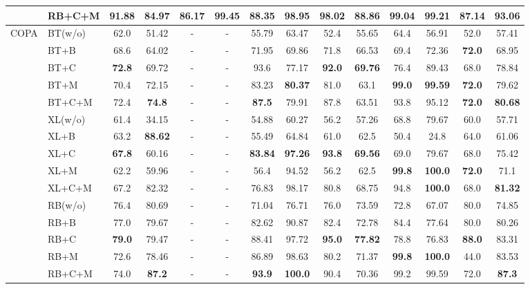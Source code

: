 \documentclass{ecai}  %
\begin{document}
\begin{table*}[th]
\begin{tabular}{ll|c|ccccccccccc}
 						       \\ 
		   & RB+C+M& 91.88&84.97&\bf{86.17}&\bf{99.45}&88.35&\bf{98.95}&98.02&88.86&99.04&99.21&87.14&\bf{93.06}
 					     	       \\ 

	\midrule
		\multirow{15}{*}{COPA} 

 		    
                &  BT(w/o) &62.0&51.42&-&-&55.79&63.47&52.4&55.65&64.4&56.91&52.0&57.41
                						\\ 
		&  BT+B & 68.6&64.02&-&-&71.95&69.86&71.8&66.53&69.4&72.36&\bf{72.0}&68.95
 						        \\ 
		&  BT+C & \bf{72.8}&69.72&-&-&93.6&77.17&\bf{92.0}&\bf{69.76}&76.4&89.43&68.0&78.84
 						        \\ 
		   & BT+M &70.4&72.15&-&-&83.23&\bf{80.37}&81.0&63.1&\bf{99.0}&\bf{99.59}&\bf{72.0}&79.62
 						       \\ 
		   & BT+C+M&72.4&\bf{74.8}&-&-&\bf{87.5}&79.91&87.8&63.51&93.8&95.12&\bf{72.0}&\bf{80.68}
		
 					     	       \\ \cmidrule{2-14}
						          
			&  XL(w/o) &61.4&34.15&-&-&54.88&60.27&56.2&57.26&68.8&79.67&60.0&57.71
                						\\ 
		&  XL+B & 63.2&\bf{88.62}&-&-&55.49&64.84&61.0&62.5&50.4&24.8&64.0&61.06
 						        \\ 
		&  XL+C & \bf{67.8}&60.16&-&-&\bf{83.84}&\bf{97.26}&\bf{93.8}&\bf{69.56}&69.0&79.67&68.0&75.42
 						        \\ 
		   & XL+M & 62.2&59.96&-&-&56.4&94.52&56.2&62.5&\bf{99.8}&\bf{100.0}&\bf{72.0}&71.1
 						       \\ 
		   & XL+C+M&67.2&82.32&-&-&76.83&98.17&80.8&68.75&94.8&\bf{100.0}&68.0&\bf{81.32}
 					     	       \\ \cmidrule{2-14}
	&  RB(w/o) & 76.4&80.69&-&-&71.04&76.71&76.0&73.59&72.8&67.07&80.0&74.85
                						\\ 
		&  RB+B & 77.0&79.67&-&-&82.62&90.87&82.4&72.78&84.4&77.64&80.0&80.26
 						        \\ 
		&  RB+C & \bf{79.0}&79.47&-&-&88.41&97.72&\bf{95.0}&\bf{77.82}&78.8&76.83&\bf{88.0}&83.31
 						        \\ 
		   & RB+M &72.6&78.46&-&-&86.89&98.63&80.2&71.37&\bf{99.8}&\bf{100.0}&44.0&83.53
 						       \\ 
		   & RB+C+M& 74.0&\bf{87.2}&-&-&\bf{93.9}&\bf{100.0}&90.4&70.36&99.2&99.59&72.0&\bf{87.3}
 					     	       \\ 



\end{tabular}
\end{table*}
\end{document}
